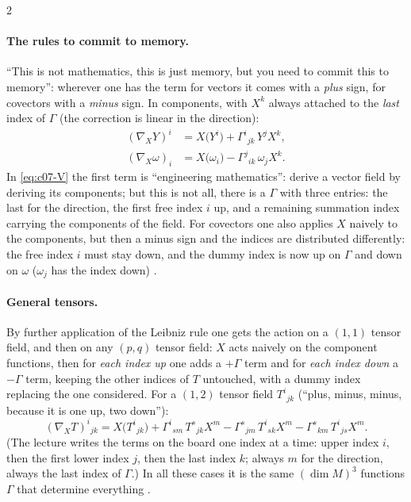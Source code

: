 \begin{paracol}{2}
\paragraph{The rules to commit to memory.} ``This is not mathematics, this is just memory, but you need to commit this to memory'': wherever one has the term for vectors it comes with a \emph{plus} sign, for covectors with a \emph{minus} sign. In components, with $X^k$ always attached to the \emph{last} index of $\Gamma$ (the correction is linear in the direction):
\begin{align}
  (\nabla_XY)^i&=X\bigl(Y^i\bigr)+\Gamma^i{}_{jk}\,Y^jX^k,\label{eq:c07-V}\\
  (\nabla_X\omega)_i&=X\bigl(\omega_i\bigr)-\Gamma^j{}_{ik}\,\omega_jX^k.\label{eq:c07-CoV}
\end{align}
In \cref{eq:c07-V} the first term is ``engineering mathematics'': derive a vector field by deriving its components; but this is not all, there is a $\Gamma$ with three entries: the last for the direction, the first free index $i$ up, and a remaining summation index carrying the components of the field. For covectors one also applies $X$ naively to the components, but then a minus sign and the indices are distributed differently: the free index $i$ must stay down, and the dummy index is now up on $\Gamma$ and down on $\omega$ ($\omega_j$ has the index down)
.

\paragraph{General tensors.} By further application of the Leibniz rule one gets the action on a $(1,1)$ tensor field, and then on any $(p,q)$ tensor field: $X$ acts naively on the component functions, then for \emph{each index up} one adds a $+\Gamma$ term and for \emph{each index down} a $-\Gamma$ term, keeping the other indices of $T$ untouched, with a dummy index replacing the one considered. For a $(1,2)$ tensor field $T^i{}_{jk}$ (``plus, minus, minus, because it is one up, two down''):
\[
  (\nabla_XT)^i{}_{jk}=X\bigl(T^i{}_{jk}\bigr)+\Gamma^i{}_{sm}\,T^s{}_{jk}X^m-\Gamma^s{}_{jm}\,T^i{}_{sk}X^m-\Gamma^s{}_{km}\,T^i{}_{js}X^m.
\]
(The lecture writes the terms on the board one index at a time: upper index $i$, then the first lower index $j$, then the last index $k$; always $m$ for the direction, always the last index of $\Gamma$.) In all these cases it is the same $(\dim M)^3$ functions $\Gamma$ that determine everything .


\end{paracol}
